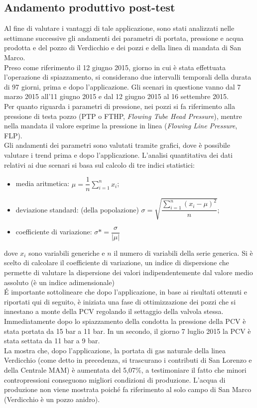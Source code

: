 \subsection{Andamento produttivo post-test}
Al fine di valutare i vantaggi di tale applicazione, sono stati analizzati nelle settimane successive gli andamenti dei parametri di portata, pressione e acqua prodotta e del pozzo di Verdicchio e dei pozzi e della linea di mandata di San Marco.\\
Preso come riferimento il 12 giugno 2015, giorno in cui è stata effettuata l'operazione di spiazzamento, si considerano due intervalli temporali della durata di 97 giorni, prima e dopo l'applicazione. Gli scenari in questione vanno dal 7 marzo 2015 all'11 giugno 2015 e dal 12 giugno 2015 al 16 settembre 2015.\\
Per quanto riguarda i parametri di pressione, nei pozzi si fa riferimento alla pressione di testa pozzo (PTP o FTHP, \textit{Flowing Tube Head Pressure}), mentre nella mandata il valore esprime la pressione in linea (\textit{Flowing Line Pressure}, FLP).\\
Gli andamenti dei parametri sono valutati tramite grafici, dove è possibile valutare i trend prima e dopo l'applicazione. L'analisi quantitativa dei dati relativi ai due scenari si basa sul calcolo di tre indici statistici: 
\begin{itemize}
\item media aritmetica: \(\mu=\dfrac{1}{n}\sum_{i=1}^n x_i\); 
\item deviazione standard: (della popolazione) \(\sigma= \sqrt{\dfrac{\sum_{i=1}^{n} (x_i-\mu)^2}{n}}\);
\item coefficiente di variazione: \(\sigma\ast= \dfrac{\sigma}{|\mu|}\)
\end{itemize}
dove \(x_i\) sono variabili generiche e \(n\) il numero di variabili della serie generica. Si è scelto di calcolare il coefficiente di variazione, un indice di dispersione che permette di valutare la dispersione dei valori indipendentemente dal valore medio assoluto (è un indice adimensionale)\\
\'E importante sottolineare che dopo l'applicazione, in base ai risultati ottenuti e riportati qui di seguito, è iniziata una fase di ottimizzazione dei pozzi che si innestano a monte della PCV regolando il settaggio della valvola stessa. Immediatamente dopo lo spiazzamento della condotta la pressione della PCV è stata portata da 15 bar a 11 bar. In un secondo, il giorno 7 luglio 2015 la PCV è stata settata da 11 bar a 9 bar.\\
La  mostra che, dopo l'applicazione, la portata di gas naturale della linea Verdicchio (come detto in precedenza, si trascurano i contributi di San Lorenzo e della Centrale MAM) è aumentata del 5,07\%, a testimoniare il fatto che minori contropressioni conseguono migliori condizioni di produzione. L'acqua di produzione non viene mostrata poiché fa riferimento al solo campo di San Marco (Verdicchio è un pozzo anidro).

